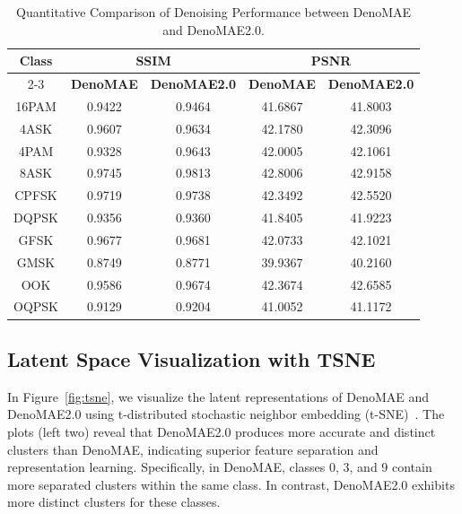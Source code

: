 \begin{table}[!htbp]
    \centering
    \caption{Quantitative Comparison of Denoising Performance between DenoMAE and DenoMAE2.0.}
    \label{tab:ssim_psnr_comparison}
    \renewcommand{\arraystretch}{1.1}
    \begin{tabular}{ccccc}
        \hline
        \multirow{2}{*}{\textbf{Class}} & \multicolumn{2}{c}{\textbf{SSIM}} 
        & \multicolumn{2}{c}{\textbf{PSNR}} \\ 
        \cline{2-3} \cline{4-5}
        & \textbf{DenoMAE} & \textbf{DenoMAE2.0} & \textbf{DenoMAE} & \textbf{DenoMAE2.0} \\ \hline
        16PAM  & 0.9422 & 0.9464 & 41.6867 & 41.8003 \\
        4ASK   & 0.9607 & 0.9634 & 42.1780 & 42.3096 \\
        4PAM   & 0.9328 & 0.9643 & 42.0005 & 42.1061 \\
        8ASK   & 0.9745 & 0.9813 & 42.8006 & 42.9158 \\
        CPFSK  & 0.9719 & 0.9738 & 42.3492 & 42.5520 \\
        DQPSK  & 0.9356 & 0.9360 & 41.8405 & 41.9223 \\
        GFSK   & 0.9677 & 0.9681 & 42.0733 & 42.1021 \\
        GMSK   & 0.8749 & 0.8771 & 39.9367 & 40.2160 \\
        OOK    & 0.9586 & 0.9674 & 42.3674 & 42.6585 \\
        OQPSK  & 0.9129 & 0.9204 & 41.0052 & 41.1172 \\ \hline
    \end{tabular}
\end{table}

\subsection{Latent Space Visualization with TSNE}

In Figure~\ref{fig:tsne}, we visualize the latent representations of DenoMAE and DenoMAE2.0 using t-distributed stochastic neighbor embedding (t-SNE)~\cite{van2008visualizing}. The plots (left two) reveal that DenoMAE2.0 produces more accurate and distinct clusters than DenoMAE, indicating superior feature separation and representation learning. Specifically, in DenoMAE, classes 0, 3, and 9 contain more separated clusters within the same class. In contrast, DenoMAE2.0 exhibits more distinct clusters for these classes.

